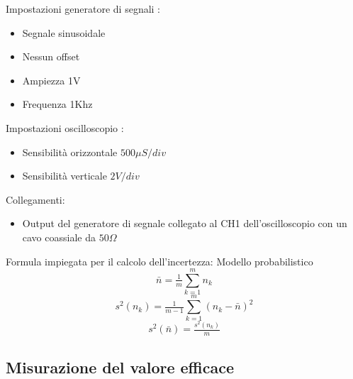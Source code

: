 \documentclass[a4paper]{article}
\begin{document}
Impostazioni generatore di segnali :
\begin{itemize}
\item Segnale sinusoidale
\item Nessun offset
\item Ampiezza 1V
\item Frequenza 1Khz
\end{itemize}

Impostazioni oscilloscopio :
\begin{itemize}
\item Sensibilità orizzontale \(500  \mu S/div \)
\item Sensibilità verticale \(2 V/div\)
\end{itemize}

Collegamenti:
\begin{itemize}
\item Output del generatore di segnale collegato al CH1 dell'oscilloscopio con un cavo coassiale da \(50 \Omega\)  
\end{itemize}

Formula impiegata per il calcolo dell’incertezza: Modello probabilistico \[\bar{n} = \tfrac{1}{m}\sum_{k=1}^m n_k \]
\[s^2 (n_k)= \tfrac{1}{m-1}\sum_{k=1}^m (n_k - \bar{n})^2 \] 
\[s^2 (\bar{n}) = \tfrac{s^2 (n_k)}{m}\]

\setcounter{secnumdepth}{1}
\subsection{Misurazione del valore efficace}
\end{document}
